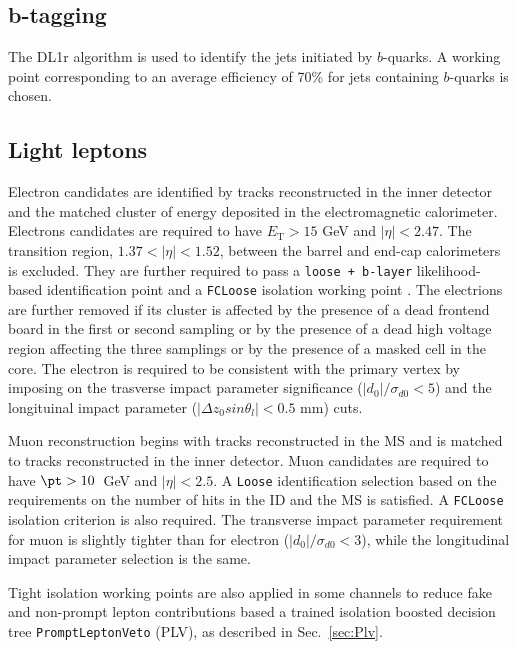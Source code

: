 \subsection{b-tagging}
The {\texttt\scriptsize DL1r} \cite{btag1} algorithm is used to identify the jets initiated by $b$-quarks. A working point corresponding to an average efficiency of 70\% for jets containing $b$-quarks is chosen.

\subsection{Light leptons}
Electron candidates are identified by tracks reconstructed in the inner detector and the matched cluster of energy deposited in the electromagnetic calorimeter. Electrons candidates are required to have $E_{\text{T}} > 15$ GeV and $|\eta|<2.47$. The transition region, $1.37<|\eta|<1.52$, between the barrel and end-cap calorimeters is excluded. They are further required to pass a \texttt{loose + b-layer} likelihood-based identification point \cite{ElectronID} and a \texttt{FCLoose} isolation working point \cite{IsolationWP}. The electrions are further removed  if its cluster is affected by the presence of a dead frontend board in the first or second sampling or by the presence of a dead high voltage region affecting the three samplings or by the presence of a masked cell in the core. The electron is required to be consistent with the primary vertex by imposing on the trasverse impact parameter significance ($|d_0|/\sigma_{d0}<5$) and 
the longituinal impact parameter ($|\Delta z_0 sin\theta_l|<0.5$ mm) cuts. 

Muon reconstruction begins with tracks reconstructed in the MS and is matched to tracks reconstructed in the inner detector. Muon candidates are required to have $\pt>10$~GeV and $|\eta|<2.5$. A \texttt{Loose} identification selection \cite{MuonSelectionTool} based on the requirements on the number of hits in the ID and the MS is satisfied. A \texttt{FCLoose} isolation \cite{IsolationWP} criterion is also required. The transverse impact parameter requirement for muon is slightly tighter than for electron ($|d_0|/\sigma_{d0}<3$), while the longitudinal impact
parameter selection is the same. 

Tight isolation working points are also applied in some channels to reduce fake and non-prompt lepton contributions based a trained isolation boosted decision tree \texttt{PromptLeptonVeto} 
(PLV), as described in Sec.~\ref{sec:Plv}.

